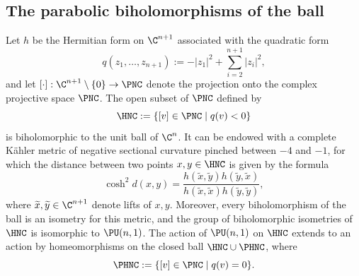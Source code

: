 \subsection{The parabolic biholomorphisms of the ball}\label{ss-section-preli-parab}

Let $h$ be the Hermitian form on $\C^{n+1}$ associated with the quadratic form
\begin{equation*}
q(z_1,\dots,z_{n+1}):=-\lvert z_1\rvert^{2} + \sum_{i=2}^{n+1}\lvert z_i\rvert^{2},
\end{equation*}
and let $[\cdot]:\C^{n+1}\setminus\{0\} \to \PNC$ denote the projection onto the complex projective space $\PNC$. The open subset of $\PNC$ defined by
\begin{equation*}
\HNC:= \{[v]\in \PNC \mid q(v)<0\}
\end{equation*}
is biholomorphic to the unit ball of $\C^{n}$. It can be endowed with a complete Kähler metric of negative sectional curvature pinched between $-4$ and $-1$, for which the distance between two points $x,y\in \HNC$ is given by the formula
\begin{equation*}
\cosh^{2}d(x,y) = \frac{h(\widetilde{x},\widetilde{y}) h(\widetilde{y},\widetilde{x})}{ h(\widetilde{x},\widetilde{x}) h(\widetilde{y},\widetilde{y})},
\end{equation*}
where $\widetilde{x},\widetilde{y}\in \C^{n+1}$ denote lifts of $x,y$. Moreover, every biholomorphism of the ball is an isometry for this metric, and the group of biholomorphic isometries of $\HNC$ is isomorphic to $\PU(n,1)$. The action of $\PU(n,1)$ on $\HNC$ extends to an action by homeomorphisms on the closed ball $\HNC\cup \PHNC$, where
\begin{equation*}
\PHNC:= \{[v]\in \PNC \mid q(v)=0\}.
\end{equation*}

